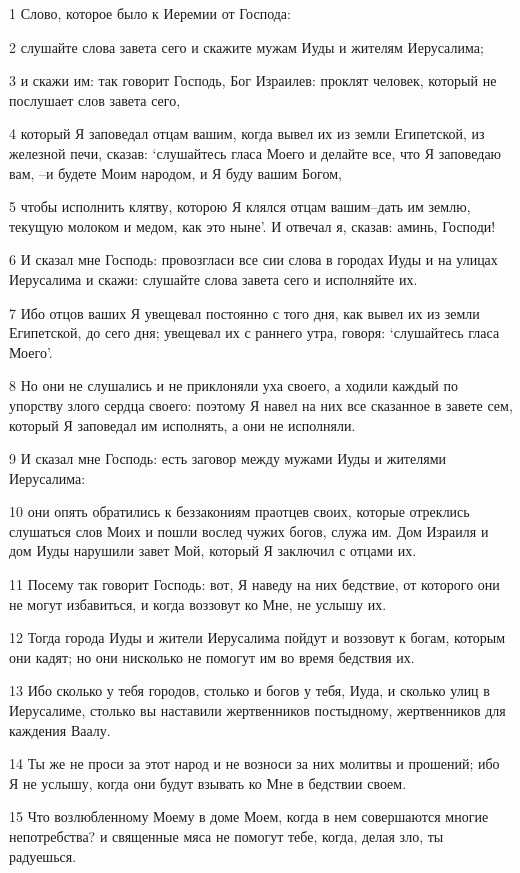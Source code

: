 \par 1 Слово, которое было к Иеремии от Господа:
\par 2 слушайте слова завета сего и скажите мужам Иуды и жителям Иерусалима;
\par 3 и скажи им: так говорит Господь, Бог Израилев: проклят человек, который не послушает слов завета сего,
\par 4 который Я заповедал отцам вашим, когда вывел их из земли Египетской, из железной печи, сказав: `слушайтесь гласа Моего и делайте все, что Я заповедаю вам, --и будете Моим народом, и Я буду вашим Богом,
\par 5 чтобы исполнить клятву, которою Я клялся отцам вашим--дать им землю, текущую молоком и медом, как это ныне'. И отвечал я, сказав: аминь, Господи!
\par 6 И сказал мне Господь: провозгласи все сии слова в городах Иуды и на улицах Иерусалима и скажи: слушайте слова завета сего и исполняйте их.
\par 7 Ибо отцов ваших Я увещевал постоянно с того дня, как вывел их из земли Египетской, до сего дня; увещевал их с раннего утра, говоря: `слушайтесь гласа Моего'.
\par 8 Но они не слушались и не приклоняли уха своего, а ходили каждый по упорству злого сердца своего: поэтому Я навел на них все сказанное в завете сем, который Я заповедал им исполнять, а они не исполняли.
\par 9 И сказал мне Господь: есть заговор между мужами Иуды и жителями Иерусалима:
\par 10 они опять обратились к беззакониям праотцев своих, которые отреклись слушаться слов Моих и пошли вослед чужих богов, служа им. Дом Израиля и дом Иуды нарушили завет Мой, который Я заключил с отцами их.
\par 11 Посему так говорит Господь: вот, Я наведу на них бедствие, от которого они не могут избавиться, и когда воззовут ко Мне, не услышу их.
\par 12 Тогда города Иуды и жители Иерусалима пойдут и воззовут к богам, которым они кадят; но они нисколько не помогут им во время бедствия их.
\par 13 Ибо сколько у тебя городов, столько и богов у тебя, Иуда, и сколько улиц в Иерусалиме, столько вы наставили жертвенников постыдному, жертвенников для каждения Ваалу.
\par 14 Ты же не проси за этот народ и не возноси за них молитвы и прошений; ибо Я не услышу, когда они будут взывать ко Мне в бедствии своем.
\par 15 Что возлюбленному Моему в доме Моем, когда в нем совершаются многие непотребства? и священные мяса не помогут тебе, когда, делая зло, ты радуешься.
